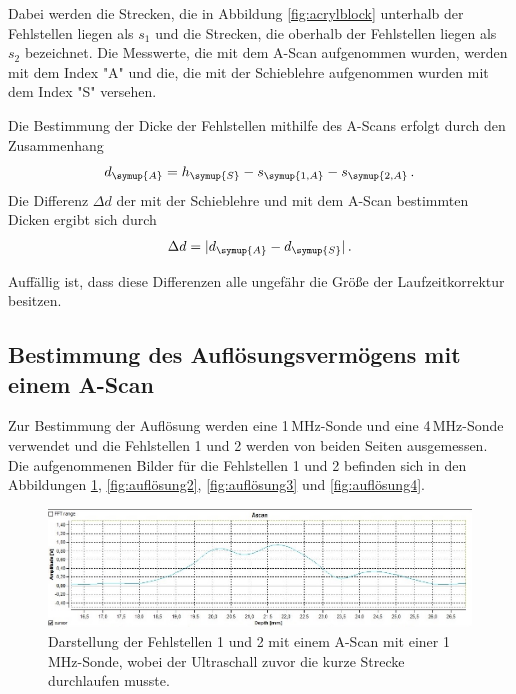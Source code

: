 Dabei werden die Strecken, die in Abbildung \ref{fig:acrylblock} unterhalb der Fehlstellen liegen
als $s_1$ und die Strecken, die oberhalb der Fehlstellen liegen als $s_2$ bezeichnet.
Die Messwerte, die mit dem A-Scan aufgenommen wurden, werden mit dem Index "A"
und die, die mit der Schieblehre aufgenommen wurden mit dem Index "S" versehen.

Die Bestimmung der Dicke der Fehlstellen mithilfe des A-Scans erfolgt durch den
Zusammenhang
\begin{equation}
  d_{\symup{A}}=h_{\symup{S}}-s_{\symup{1,A}}-s_{\symup{2,A}} \,.
\end{equation}
Die Differenz $\Delta d$ der mit der Schieblehre und mit dem A-Scan bestimmten
Dicken ergibt sich durch
\begin{equation}
  \Delta d=|d_{\symup{A}}-d_{\symup{S}}| \,.
\end{equation}

Auffällig ist, dass diese Differenzen alle ungefähr die Größe der Laufzeitkorrektur
besitzen.

\subsection{Bestimmung des Auflösungsvermögens mit einem A-Scan}
\label{subsec:A_scan_auflösung}

Zur Bestimmung der Auflösung werden eine 1\,MHz-Sonde und eine 4\,MHz-Sonde verwendet
und die Fehlstellen 1 und 2 werden von beiden Seiten ausgemessen.
Die aufgenommenen Bilder für die Fehlstellen 1 und 2 befinden sich in den Abbildungen \ref{fig:auflösung1},
\ref{fig:auflösung2}, \ref{fig:auflösung3} und \ref{fig:auflösung4}.

\begin{figure}[H]
  \centering
  \includegraphics[width=\textwidth]{data/1mhzdoppelteFehlstellekurzelLaufzeitGedrehtwieinZeichnung.jpeg}
  \caption{Darstellung der Fehlstellen 1 und 2 mit einem A-Scan mit einer 1\,MHz-Sonde, wobei der Ultraschall
  zuvor die kurze Strecke durchlaufen musste.}
  \label{fig:auflösung1}
\end{figure}

